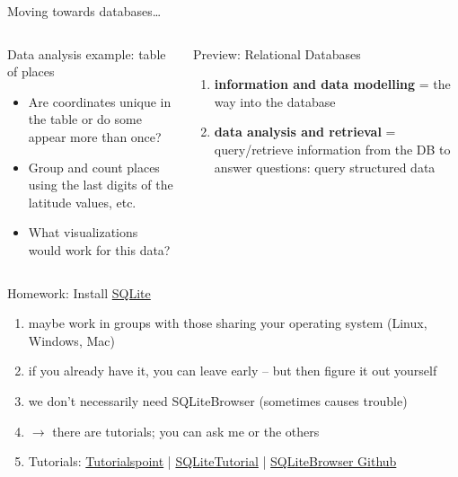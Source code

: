 \begin{frame}{Moving towards databases\dots}
  \begin{columns}[T,onlytextwidth]
    \footnotesize
    \begin{block}{Data analysis example: table of places}
    \begin{itemize}
        \item Are coordinates unique in the table or do some appear more than once? 
        \item Group and count places using the last digits of the latitude values, etc. 
        \item What visualizations would work for this data?
    \end{itemize}
    \end{block}


      \begin{exampleblock}{Preview: Relational Databases}
      \begin{enumerate}\small
          \item  \textbf{information and data modelling} = the way into the database
          \item \textbf{data analysis and retrieval} = query/retrieve information from the DB to answer questions: query structured data 
      \end{enumerate} 
      \end{exampleblock}
  \end{columns}
\end{frame}


\begin{frame}[standout]
    \alert{Homework:} Install \alert{\href{https://sqlitebrowser.org/dl/}{SQLite}} \\[1em]
    {\footnotesize
    \begin{enumerate}
        \item maybe work in groups with those sharing your operating system (Linux, Windows, Mac)
        \item if you already have it, you can leave early -- but then figure it out yourself
        \item we don't necessarily need SQLiteBrowser (sometimes causes trouble)
        \item $\to$ there are tutorials; you can ask me or the others
        \item \alert{Tutorials: \href{https://www.tutorialspoint.com/sqlite/sqlite_installation.htm}{Tutorialspoint} | \href{https://www.sqlitetutorial.net/download-install-sqlite/}{SQLiteTutorial} | \href{https://github.com/sqlitebrowser/sqlitebrowser}{SQLiteBrowser Github}}
    \end{enumerate}
    }
\end{frame}



